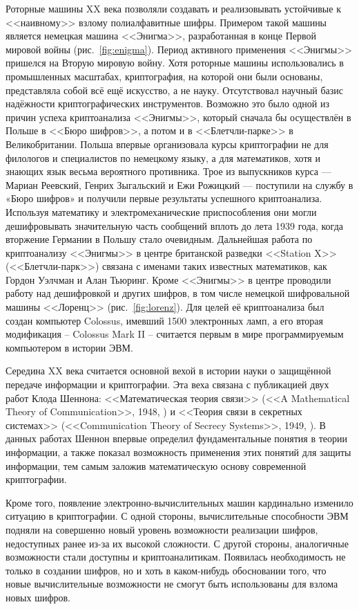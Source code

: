 Роторные машины XX века позволяли создавать и реализовывать устойчивые к <<наивному>> взлому полиалфавитные шифры. Примером такой машины является немецкая машина <<Энигма>>, разработанная в конце Первой мировой войны (рис.~\ref{fig:enigma}). Период активного применения <<Энигмы>> пришелся на Вторую мировую войну. Хотя роторные машины использовались в промышленных масштабах, криптография, на которой они были основаны, представляла собой всё ещё искусство, а не науку. Отсутствовал научный базис надёжности криптографических инструментов. Возможно это было одной из причин успеха криптоанализа <<Энигмы>>, который сначала бы осуществлён в Польше в <<Бюро шифров>>, а потом и в <<Блетчли-парке>> в Великобритании. Польша впервые организовала курсы криптографии не для филологов и специалистов по немецкому языку, а для математиков, хотя и знающих язык весьма вероятного противника. Трое из выпускников курса — Мариан Реевский, Генрих Зыгальский и Ежи Рожицкий — поступили на службу в «Бюро шифров» и получили первые результаты успешного криптоанализа. Используя математику и электромеханические приспособления они могли дешифровывать значительную часть сообщений вплоть до лета 1939 года, когда вторжение Германии в Польшу стало очевидным. Дальнейшая работа по криптоанализу <<Энигмы>> в центре британской разведки <<Station X>> (<<Блетчли-парк>>) связана с именами таких известных математиков, как Гордон Уэлчман и Алан Тьюринг. Кроме <<Энигмы>> в центре проводили работу над дешифровкой и других шифров, в том числе немецкой шифровальной машины <<Лоренц>> (рис.~\ref{fig:lorenz}). Для целей её криптоанализа был создан компьютер Colossus, имевший 1500 электронных ламп, а его вторая модификация -- Colossus Mark II -- считается первым в мире программируемым компьютером в истории ЭВМ.

Середина XX века считается основной вехой в истории науки о защищённой передаче информации и криптографии. Эта веха связана с публикацией двух работ Клода Шеннона: <<Математическая теория связи>> (<<A Mathematical Theory of Communication>>, 1948, \cite{Shannon:1948:MTCa, Shannon:1948:MTCb}) и <<Теория связи в секретных системах>> (<<Communication Theory of Secrecy Systems>>, 1949, \cite{Shannon:1949:CTS}). В данных работах Шеннон впервые определил фундаментальные понятия в теории информации, а также показал возможность применения этих понятий для защиты информации, тем самым заложив математическую основу современной криптографии.

Кроме того, появление электронно-вычислительных машин кардинально изменило ситуацию в криптографии. С одной стороны, вычислительные способности ЭВМ подняли на совершенно новый уровень возможности реализации шифров, недоступных ранее из-за их высокой сложности. С другой стороны, аналогичные возможности стали доступны и криптоаналитикам. Появилась необходимость не только в создании шифров, но и хоть в каком-нибудь обосновании того, что новые вычислительные возможности не смогут быть использованы для взлома новых шифров.

